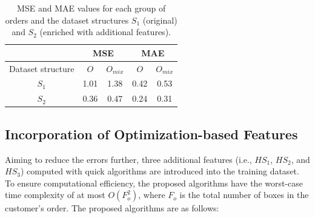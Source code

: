 \documentclass[runningheads]{llncs}
\begin{document}
\begin{table}[H]
\centering
\caption{MSE and MAE values for each group of orders and the dataset structures $S_1$ (original) and $S_2$ (enriched with additional features).}\label{tab:new-cols-comparison}
\begin{tabular}{c|cc|cc|}
\cline{2-5}
\multicolumn{1}{l|}{}       & \multicolumn{2}{c|}{MSE}         & \multicolumn{2}{c|}{MAE}         \\ \hline \hline
\multicolumn{1}{|c|}{Dataset structure} & \multicolumn{1}{c|}{$O$} & $O_{mix}$ & \multicolumn{1}{c|}{$O$} & $O_{mix}$ \\ \hline
\multicolumn{1}{|c|}{$S_1$} & \multicolumn{1}{c|}{1.01} & 1.38 & \multicolumn{1}{c|}{0.42} & 0.53 \\ \hline
\multicolumn{1}{|c|}{$S_2$} & \multicolumn{1}{c|}{0.36} & 0.47 & \multicolumn{1}{c|}{0.24} & 0.31 \\ \hline
\end{tabular}
\end{table}


\subsection{Incorporation of Optimization-based Features \label{heuristicsolution}}
    

Aiming to reduce the errors further, three additional features (i.e., $HS_1$, $HS_2$, and $HS_3$) computed with quick algorithms are introduced into the training dataset. To ensure computational efficiency, the proposed algorithms have the worst-case time complexity of at most $O(F_{o}^{2})$, where $F_{o}$ is the total number of boxes in the customer's order. The proposed algorithms are as follows:
\end{document}
